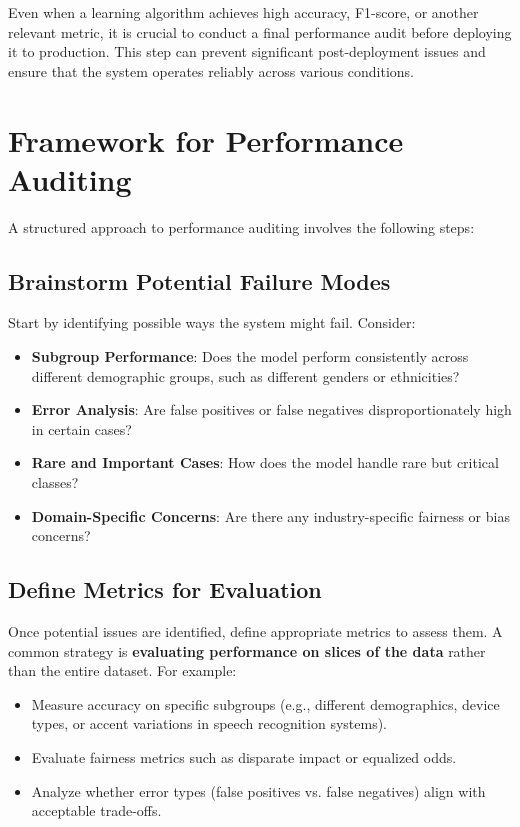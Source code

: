 \documentclass[12pt,openany]{book}
\begin{document}
Even when a learning algorithm achieves high accuracy, F1-score, or another relevant metric, it is crucial to conduct a final performance audit before deploying it to production. This step can prevent significant post-deployment issues and ensure that the system operates reliably across various conditions. 

\section{Framework for Performance Auditing}

A structured approach to performance auditing involves the following steps:

\subsection{Brainstorm Potential Failure Modes}
Start by identifying possible ways the system might fail. Consider:
\begin{itemize}
    \item \textbf{Subgroup Performance}: Does the model perform consistently across different demographic groups, such as different genders or ethnicities?
    \item \textbf{Error Analysis}: Are false positives or false negatives disproportionately high in certain cases?
    \item \textbf{Rare and Important Cases}: How does the model handle rare but critical classes?
    \item \textbf{Domain-Specific Concerns}: Are there any industry-specific fairness or bias concerns?
\end{itemize}

\subsection{Define Metrics for Evaluation}
Once potential issues are identified, define appropriate metrics to assess them. A common strategy is \textbf{evaluating performance on slices of the data} rather than the entire dataset. For example:
\begin{itemize}
    \item Measure accuracy on specific subgroups (e.g., different demographics, device types, or accent variations in speech recognition systems).
    \item Evaluate fairness metrics such as disparate impact or equalized odds.
    \item Analyze whether error types (false positives vs. false negatives) align with acceptable trade-offs.
\end{itemize}
\end{document}
